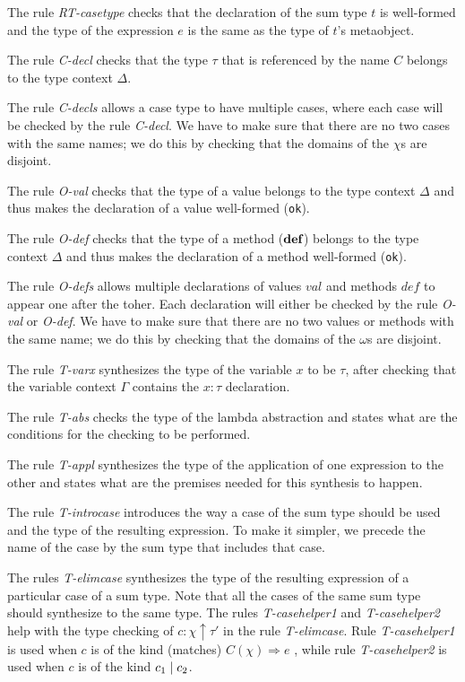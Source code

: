 The rule \textit{RT-casetype} checks that the declaration of the sum type $t$ is well-formed and the type of the expression $e$ is the same as the type of $t$'s metaobject.

The rule \textit{C-decl} checks that the type $\tau$ that is referenced by the name $C$ belongs to the type context $\Delta$.

The rule \textit{C-decls} allows a case type to have multiple cases, where each case will be checked by the rule \textit{C-decl}. We have to make sure that there are no two cases with the same names; we do this by checking that the domains of the $\chi$s are disjoint.

The rule \textit{O-val} checks that the type of a value belongs to the type context $\Delta$ and thus makes the declaration of a value well-formed (\texttt{ok}).

The rule \textit{O-def} checks that the type of a method ($\textbf{def}$) belongs to the type context $\Delta$ and thus makes the declaration of a method well-formed (\texttt{ok}).

The rule \textit{O-defs} allows multiple declarations of values $val$ and methods $def$ to appear one after the toher. Each declaration will either be checked by the rule \textit{O-val} or \textit{O-def}. We have to make sure that there are no two values or methods with the same name; we do this by checking that the domains of the $\omega$s are disjoint.

The rule \textit{T-varx} synthesizes the type of the variable $x$ to be $\tau$, after checking that the variable context $\Gamma$ contains the $x:\tau$ declaration. 

The rule \textit{T-abs} checks the type of the lambda abstraction and states what are the conditions for the checking to be performed.

The rule \textit{T-appl} synthesizes the type of the application of one expression to the other and states what are the premises needed for this synthesis to happen.

The rule \textit{T-introcase} introduces the way a case of the sum type should be used and the type of the resulting expression. To make it simpler, we precede the name of the case by the sum type that includes that case.

The rules \textit{T-elimcase} synthesizes the type of the resulting expression of a particular case of a sum type. Note that all the cases of the same sum type should synthesize to the same type. The rules  \textit{T-casehelper1} and \textit{T-casehelper2} help with the type checking of $c:\chi \uparrow \tau'$ in the rule \textit{T-elimcase}. Rule \textit{T-casehelper1} is used when $c$ is of the kind (matches) $C(\chi)\Rightarrow e$ , while rule \textit{T-casehelper2} is used when $c$ is of the kind $c_1 \mathrel{\mid} c_2$.

